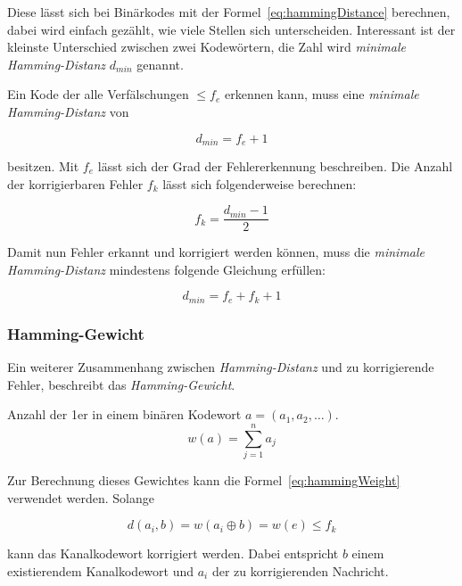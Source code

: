 Diese lässt sich bei Binärkodes mit der Formel~\ref{eq:hammingDistance} berechnen, dabei wird einfach gezählt, wie viele Stellen sich unterscheiden. Interessant ist der kleinste Unterschied zwischen zwei Kodewörtern, die Zahl wird \emph{minimale Hamming-Distanz} $d_{min}$ genannt.

Ein Kode der alle Verfälschungen $\leq f_e$ erkennen kann, muss eine \emph{minimale Hamming-Distanz} von 

\begin{equation}
d_{min} = f_e + 1
\end{equation}

besitzen. Mit $f_e$ lässt sich der Grad der Fehlererkennung beschreiben. Die Anzahl der korrigierbaren Fehler $f_k$ lässt sich folgenderweise berechnen:

\begin{equation}
f_k = \frac{d_{min}-1}{2}
\end{equation}

Damit nun Fehler erkannt und korrigiert werden können, muss die \emph{minimale Hamming-Distanz} mindestens folgende Gleichung erfüllen: \cite[132 f.]{schoenfeld2012informations}

\begin{equation}
d_{min} = f_e + f_k + 1
\end{equation} 

\subsubsection{Hamming-Gewicht}
\label{sec:hammingWeight}
Ein weiterer Zusammenhang zwischen \emph{Hamming-Distanz} und zu korrigierende Fehler, beschreibt das \emph{Hamming-Gewicht}.

\begin{t_def}
Anzahl der 1er in einem binären Kodewort $a=(a_1,a_2,\dotsc)$.
\begin{equation}
w(a) = \sum^n_{j=1} a_j
\label{eq:hammingWeight}
\end{equation} 
\end{t_def} 

Zur Berechnung dieses Gewichtes kann die Formel~\ref{eq:hammingWeight} verwendet werden. Solange 

\begin{equation}
d(a_i,b)=w(a_i \oplus b) = w(e) \leq f_k
\end{equation} 

kann das Kanalkodewort korrigiert werden. Dabei entspricht $b$ einem existierendem Kanalkodewort und $a_i$ der zu korrigierenden Nachricht. \cite[134]{schoenfeld2012informations}
